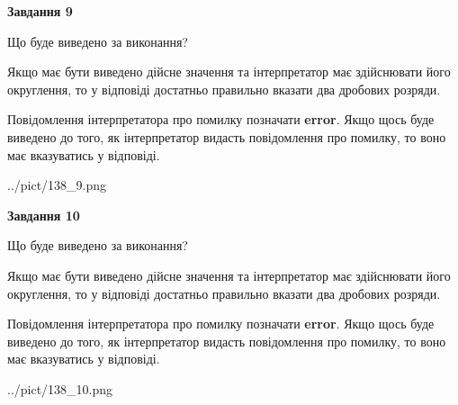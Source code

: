 \documentclass[12pt, ukrainian]{article}
\begin{document}
{\begin {Large}
{\begin {center}\textbf{Завдання 9}\end {center}}\par
Що буде виведено за виконання? \par

Якщо має бути виведено дійсне значення та інтерпретатор має здійснювати його округлення, 
то у відповіді достатньо правильно вказати два дробових розряди.

Повідомлення інтерпретатора про помилку позначати \textbf{error}.
Якщо щось буде виведено до того, як інтерпретатор видасть повідомлення про помилку, 
то воно має вказуватись у відповіді. \par

\begin{center}
	{../pict/138_9.png}
\end{center}
\newpage

{\begin {center}\textbf{Завдання 10}\end {center}}\par
Що буде виведено за виконання? \par

Якщо має бути виведено дійсне значення та інтерпретатор має здійснювати його округлення, 
то у відповіді достатньо правильно вказати два дробових розряди.

Повідомлення інтерпретатора про помилку позначати \textbf{error}.
Якщо щось буде виведено до того, як інтерпретатор видасть повідомлення про помилку, 
то воно має вказуватись у відповіді. \par

\begin{center}
	{../pict/138_10.png}
\end{center}
\newpage

\end {Large}}
\end{document}
